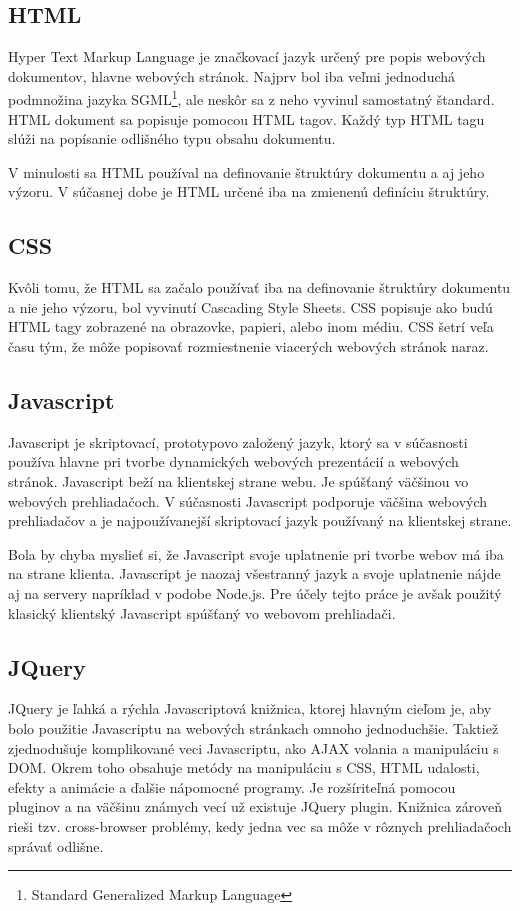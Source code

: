\subsection{HTML}
\label{sec:html}
Hyper Text Markup Language je značkovací jazyk určený pre popis webových dokumentov, hlavne webových stránok. Najprv bol iba veľmi jednoduchá podmnožina jazyka SGML\footnote{Standard Generalized Markup Language}, ale neskôr sa z neho vyvinul samostatný štandard. HTML dokument sa popisuje pomocou HTML tagov. Každý typ HTML tagu slúži na popísanie odlišného typu obsahu dokumentu.  

V minulosti sa HTML používal na definovanie štruktúry dokumentu a aj jeho výzoru. V súčasnej dobe je HTML určené iba na zmienenú definíciu štruktúry. \cite{w3-html}

\subsection{CSS}
\label{sec:css}
Kvôli tomu, že HTML sa začalo používať iba na definovanie štruktúry dokumentu a nie jeho výzoru, bol vyvinutí Cascading Style Sheets. CSS popisuje ako budú HTML tagy zobrazené na obrazovke, papieri, alebo inom médiu. CSS šetrí veľa času tým, že môže popisovať rozmiestnenie viacerých webových stránok naraz. \cite{w3-css}

\subsection{Javascript}
\label{sec:javascript}
Javascript je skriptovací, prototypovo založený jazyk, ktorý sa v súčasnosti používa hlavne pri tvorbe dynamických webových prezentácií a webových stránok. Javascript beží na klientskej strane webu. Je spúšťaný väčšinou vo webových prehliadačoch. V súčasnosti Javascript podporuje väčšina webových prehliadačov a je najpoužívanejší skriptovací jazyk používaný na klientskej strane. \cite{w3-javascript}

Bola by chyba myslieť si, že Javascript svoje uplatnenie pri tvorbe webov má iba na strane klienta. Javascript je naozaj všestranný jazyk a svoje uplatnenie nájde aj na servery napríklad v podobe Node.js. Pre účely tejto práce je avšak použitý klasický klientský Javascript spúšťaný vo webovom prehliadači.

\subsection{JQuery}
\label{sec:jquery}
JQuery je ľahká a rýchla Javascriptová knižnica, ktorej hlavným cieľom je, aby bolo použitie Javascriptu na webových stránkach omnoho jednoduchšie. Taktiež zjednodušuje komplikované veci Javascriptu, ako AJAX volania a manipuláciu s DOM. Okrem toho obsahuje metódy na manipuláciu s CSS, HTML udalosti, efekty a animácie a ďalšie nápomocné programy. Je rozšíriteľná pomocou pluginov a na väčšinu známych vecí už existuje JQuery plugin. Knižnica zároveň rieši tzv. cross-browser problémy, kedy jedna vec sa môže v rôznych prehliadačoch správať odlišne.


